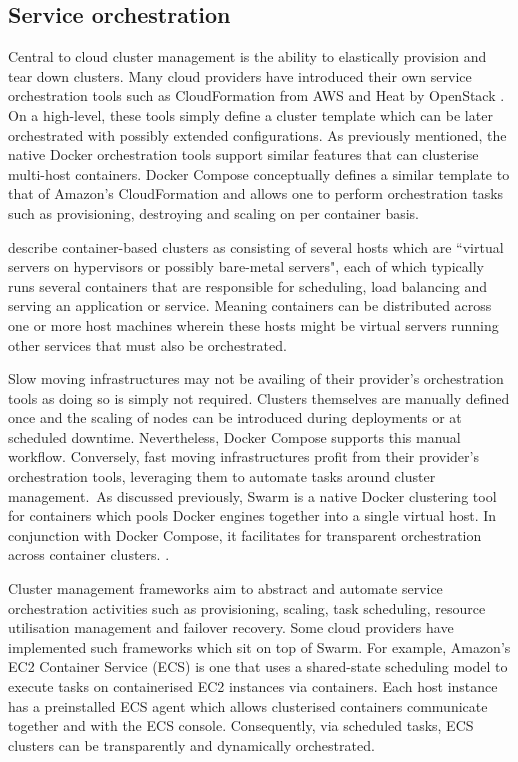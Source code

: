 \documentclass{article}
\begin{document}
\subsection{Service orchestration}
Central to cloud cluster management is the ability to elastically provision and tear down clusters. Many cloud providers have introduced their own service orchestration tools such as CloudFormation from AWS and Heat by OpenStack \citep{Dudouet}.
On a high-level, these tools simply define a cluster template which can be later orchestrated with possibly extended configurations. As previously mentioned, the native Docker orchestration tools support similar features that can clusterise multi-host containers. Docker Compose conceptually defines a similar template to that of Amazon's CloudFormation and allows one to perform orchestration tasks such as provisioning, destroying and scaling on per container basis.
\par
\citet{Claus} describe container-based clusters as consisting of several hosts which are ``virtual servers on hypervisors or possibly bare-metal servers", each of which typically runs several containers that are responsible for scheduling, load balancing and serving an application or service. Meaning containers can be distributed across one or more host machines wherein these hosts might be virtual servers running other services that must also be orchestrated.
\par
Slow moving infrastructures may not be availing of their provider's orchestration tools as doing so is simply not required. Clusters themselves are manually defined once and the scaling of nodes can be introduced during deployments or at scheduled downtime. Nevertheless, Docker Compose supports this manual workflow. Conversely, fast moving infrastructures profit from their provider's orchestration tools, leveraging them to automate tasks around cluster management.\ As discussed previously, Swarm is a native Docker clustering tool for containers which pools Docker engines together into a single virtual host. In conjunction with Docker Compose, it facilitates for transparent orchestration across container clusters. \citep{holla}.
\par
Cluster management frameworks aim to abstract and automate service orchestration activities such as provisioning, scaling, task scheduling, resource utilisation management and failover recovery. Some cloud providers have implemented such frameworks which sit on top of Swarm. For example, Amazon's EC2 Container Service (ECS) is one that uses a shared-state scheduling model to execute tasks on containerised EC2 instances via containers. Each host instance has a preinstalled ECS agent which allows clusterised containers communicate together and with the ECS console. Consequently, via scheduled tasks, ECS clusters can be transparently and dynamically orchestrated.
\end{document}
